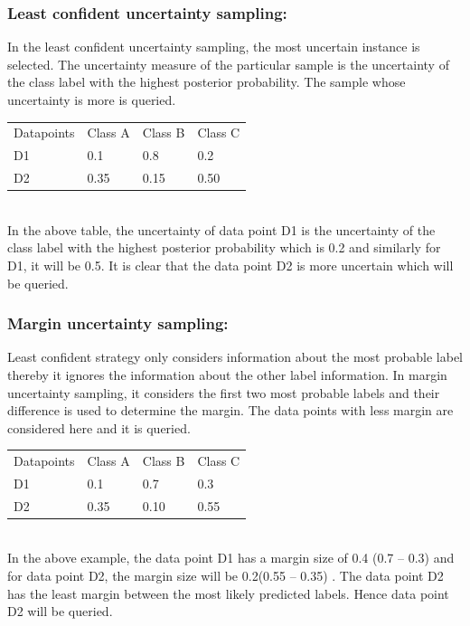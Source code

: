 \subsubsection{Least confident uncertainty sampling:} 
	In the least confident uncertainty sampling, the most uncertain instance is selected. The uncertainty measure of the particular sample is the uncertainty of the class label with the highest posterior probability. The sample whose uncertainty is more is queried.  \\
\begin{table}[h]
\centering
\begin{tabular}{llll}
Datapoints & Class A & Class B & Class C \\
D1         & 0.1     & 0.8     & 0.2     \\
D2         & 0.35    & 0.15    & 0.50   
\end{tabular}
\end{table} \\
	In the above table, the uncertainty of data point D1  is the uncertainty  of the class label with the highest posterior probability which is 0.2  and similarly for D1, it will be 0.5. It is clear that the data point D2 is more uncertain which will be queried. \cite{Settles2010}\cite{modal}
\subsubsection{Margin uncertainty sampling:}
	Least confident strategy only considers information about the most probable label thereby it ignores the information about the other label information. In margin uncertainty sampling, it considers the first two most probable labels and their difference is used to determine the margin. The data points with less margin are considered here and it is queried. \\
\begin{table}[h]
\centering
\begin{tabular}{llll}
Datapoints & Class A & Class B & Class C \\
D1         & 0.1     & 0.7     & 0.3     \\
D2         & 0.35    & 0.10    & 0.55   
\end{tabular}
\end{table} \\
In the above example, the data point D1 has a margin size of 0.4 (0.7 – 0.3) and for data point D2, the margin size will be 0.2(0.55 – 0.35) . The data point D2 has the least margin between the most likely predicted labels. Hence data point D2 will be queried. \cite{Settles2010}\cite{modal}
